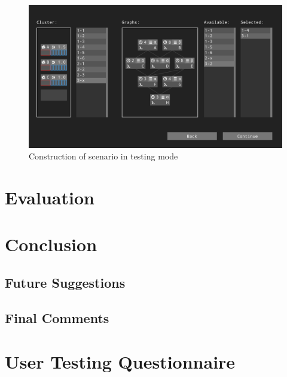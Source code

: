 \documentclass[msc,deptreport, cs]{infthesis}
\begin{document}
\begin{figure}[!htb]
  \centering
  \includegraphics[width=\columnwidth]{play3.png}
  \caption{Construction of scenario in testing mode}
  \label{fig:play3}
\end{figure}


\chapter{Evaluation}

\chapter{Conclusion}

\section{Future Suggestions} 


\section{Final Comments}




\appendix

\chapter{User Testing Questionnaire}


\end{document}
